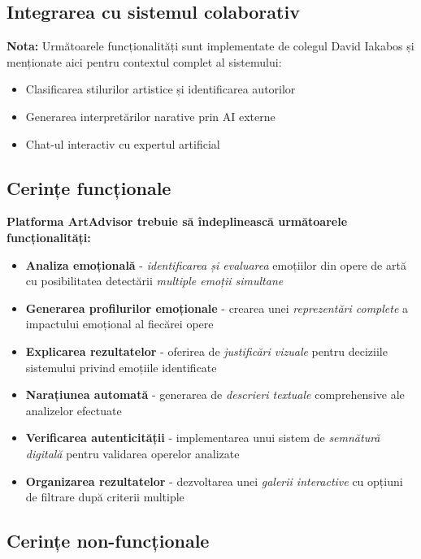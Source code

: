 \subsection{Integrarea cu sistemul colaborativ}
\textbf{Nota:} Următoarele funcționalități sunt implementate de colegul David Iakabos și menționate aici pentru contextul complet al sistemului:
\begin{itemize}
  \item Clasificarea stilurilor artistice și identificarea autorilor
  \item Generarea interpretărilor narative prin AI externe 
  \item Chat-ul interactiv cu expertul artificial
\end{itemize}

\subsection{Cerințe funcționale}
\label{subsec:obj-functionale}

\textbf{Platforma ArtAdvisor trebuie să îndeplinească următoarele funcționalități:}

\begin{itemize}
  \item \textbf{Analiza emoțională} - \emph{identificarea și evaluarea} emoțiilor din opere de artă cu posibilitatea detectării \textit{multiple emoții simultane}
  \item \textbf{Generarea profilurilor emoționale} - crearea unei \emph{reprezentări complete} a impactului emoțional al fiecărei opere
  \item \textbf{Explicarea rezultatelor} - oferirea de \textit{justificări vizuale} pentru deciziile sistemului privind emoțiile identificate  
  \item \textbf{Narațiunea automată} - generarea de \emph{descrieri textuale} comprehensive ale analizelor efectuate
  \item \textbf{Verificarea autenticității} - implementarea unui sistem de \textit{semnătură digitală} pentru validarea operelor analizate
  \item \textbf{Organizarea rezultatelor} - dezvoltarea unei \emph{galerii interactive} cu opțiuni de filtrare după criterii multiple
\end{itemize}

\subsection{Cerințe non-funcționale}
\label{subsec:obj-nonfunctionale}

